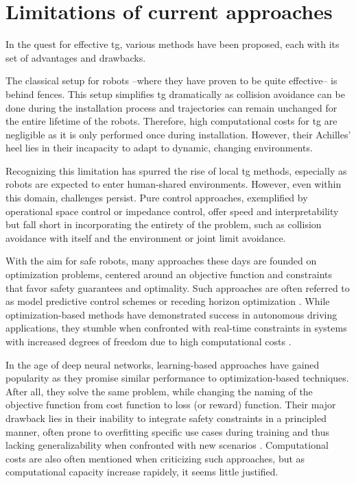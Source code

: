 \section{Limitations of current approaches}

In the quest for effective \ac{tg}, various
methods have been proposed, each with its set of advantages and
drawbacks.

The classical setup for robots --where they have
proven to be quite effective-- is behind fences. This setup
simplifies \ac{tg} dramatically as collision
avoidance can be done during the installation process and
trajectories can remain unchanged for the entire lifetime of
the robots. Therefore, high computational costs for
\ac{tg} are negligible as it is only performed
once during installation. However, their Achilles' heel lies
in their incapacity to adapt to dynamic, changing
environments.

Recognizing this limitation has spurred the rise of local
\ac{tg} methods, especially as robots are
expected to enter human-shared environments. However, even
within this domain, challenges persist. Pure control
approaches, exemplified by operational space control or
impedance control, offer speed and interpretability but fall
short in incorporating the entirety of the problem, such as
collision avoidance with itself and the environment or
joint limit avoidance.

With the aim for safe robots, many approaches these days are
founded on optimization problems, centered around an
objective function and constraints that favor safety
guarantees and optimality. Such approaches are often
referred to as model predictive control schemes or receding
horizon optimization \cite{hewing2020learning}. While
optimization-based methods have demonstrated success in
autonomous driving applications, they stumble when
confronted with real-time constraints in systems with
increased degrees of freedom due to high computational costs
\cite{spahn2021coupled}.

In the age of deep neural networks, learning-based
approaches have gained popularity as they promise similar
performance to optimization-based techniques. After all,
they solve the same problem, while changing the naming of
the objective function from cost function to loss (or
reward) function. Their major drawback lies in their
inability to integrate safety constraints in a principled
manner, often prone to overfitting specific use cases during
training and thus lacking generalizability when confronted
with new scenarios \cite{noroozi2023conventional}.
Computational costs are also often
mentioned when criticizing such approaches, but as
computational capacity increase rapidely, it seems little
justified. 

